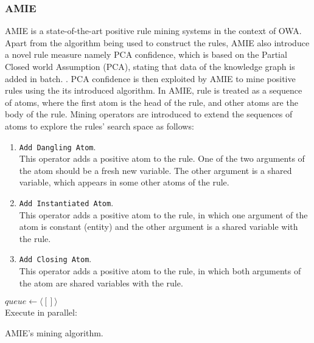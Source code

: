 \subsubsection{AMIE}
AMIE is a state-of-the-art positive rule mining systems in the context of OWA. Apart from the algorithm being used to construct the rules, AMIE also introduce a novel rule measure namely PCA confidence, which is based on the Partial Closed world Assumption (PCA), stating that data of the knowledge graph is added in batch.
.
PCA confidence is then exploited by AMIE to mine positive rules using the its introduced algorithm. In AMIE, rule is treated as a sequence of atoms, where the first atom is the head of the rule, and other atoms are the body of the rule. Mining operators are introduced to extend the sequences of atoms to explore the rules' search space as follows:
\begin{enumerate}
\item \texttt{Add Dangling Atom}.\\
  This operator adds a positive atom to the rule. One of the two arguments of the atom should be a fresh new variable. The other argument is a shared variable, which appears in some other atoms of the rule.
\item \texttt{Add Instantiated Atom}.\\
  This operator adds a positive atom to the rule, in which one argument of the atom is constant (entity) and the other argument is a shared variable with the rule.
\item \texttt{Add Closing Atom}.\\
  This operator adds a positive atom to the rule, in which both arguments of the atom are shared variables with the rule.
\end{enumerate}

\begin{algorithm}[H]
\DontPrintSemicolon
$queue\leftarrow \langle[]\rangle$\\
Execute in parallel:\\
\caption{AMIE's mining algorithm.}
\label{algor:amie}
\end{algorithm}



